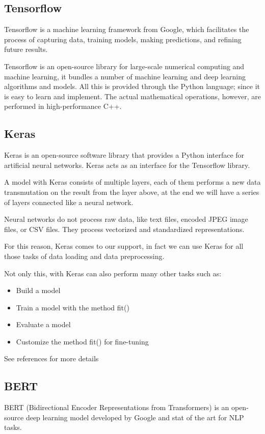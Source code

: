 \subsection{Tensorflow}
\gls{Tensorflow} \cite{noauthor_tensorflow_nodate} is a machine learning framework from Google, which facilitates the process of capturing data, training models, making predictions, and refining future results.

\gls{Tensorflow} is an open-source library for large-scale numerical computing and machine learning, it bundles a number of machine learning and deep learning algorithms and models.
All this is provided through the Python language; since it is easy to learn and implement. The actual mathematical operations, however, are performed in high-performance C++.

\subsection{Keras}
\gls{Keras} \cite{noauthor_keras_nodate} is an open-source software library that provides a Python interface for artificial neural networks. \gls{Keras} acts as an interface for the \gls{Tensorflow} library.

A model with \gls{Keras} consists of multiple layers, each of them performs a new data transmutation on the result from the layer above, at the end we will have a series of layers connected like a neural network.

Neural networks do not process raw data, like text files, encoded JPEG image files, or CSV files. They process vectorized and standardized representations.

For this reason, \gls{Keras} comes to our support, in fact we can use \gls{Keras} for all those tasks of data loading and data preprocessing.

Not only this, with \gls{Keras} can also perform many other tasks such as:
\begin{itemize}
    \item Build a model
    \item Train a model with the method fit()
    \item Evaluate a model
    \item Customize the method fit() for fine-tuning
\end{itemize}
See references for more details \cite{team_keras_nodate}

\subsection{BERT}
\gls{BERT} \cite{devlin_bert_2019} (Bidirectional Encoder Representations from Transformers) is an open-source deep learning model developed by Google and stat of the art for NLP tasks.

